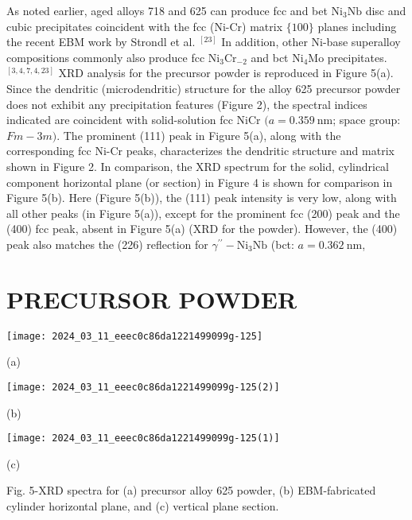 \documentclass[10pt]{article}
\begin{document}
As noted earlier, aged alloys 718 and 625 can produce fcc and bet $\mathrm{Ni}_{3} \mathrm{Nb}$ disc and cubic precipitates coincident with the fcc (Ni-Cr) matrix $\{100\}$ planes including the recent EBM work by Strondl et al. ${ }^{[23]}$ In addition, other Ni-base superalloy compositions commonly also produce fcc $\mathrm{Ni}_{3} \mathrm{Cr}_{-2}$ and bct $\mathrm{Ni}_{4} \mathrm{Mo}$ precipitates. ${ }^{[3,4,7,4,23]}$ XRD analysis for the precursor powder is reproduced in Figure 5(a). Since the dendritic (microdendritic) structure for the alloy 625 precursor powder does not exhibit any precipitation features (Figure 2), the spectral indices indicated are coincident with solid-solution fcc $\mathrm{NiCr}$ $(a=0.359 \mathrm{~nm}$; space group: $F m-3 m)$. The prominent (111) peak in Figure 5(a), along with the corresponding fcc Ni-Cr peaks, characterizes the dendritic structure and matrix shown in Figure 2. In comparison, the XRD spectrum for the solid, cylindrical component horizontal plane (or section) in Figure 4 is shown for comparison in Figure 5(b). Here (Figure 5(b)), the (111) peak intensity is very low, along with all other peaks (in Figure 5(a)), except for the prominent fcc (200) peak and the (400) fcc peak, absent in Figure 5(a) (XRD for the powder). However, the (400) peak also matches the (226) reflection for $\gamma^{\prime \prime}-\mathrm{Ni}_{3} \mathrm{Nb}$ (bct: $a=0.362 \mathrm{~nm}$,

\section*{PRECURSOR POWDER}
\begin{center}
\texttt{[image: 2024\_03\_11\_eeec0c86da1221499099g-125]}
\end{center}

(a)

\begin{center}
\texttt{[image: 2024\_03\_11\_eeec0c86da1221499099g-125(2)]}
\end{center}

(b)

\begin{center}
\texttt{[image: 2024\_03\_11\_eeec0c86da1221499099g-125(1)]}
\end{center}

(c)

Fig. 5-XRD spectra for (a) precursor alloy 625 powder, (b) EBM-fabricated cylinder horizontal plane, and (c) vertical plane section.
\end{document}
